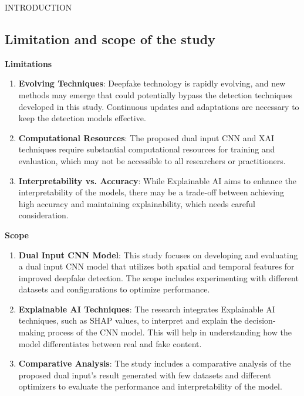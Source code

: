 \begin{section}[]{\uppercase{Introduction}}
    \subsection{Limitation and scope of the study}
    \textbf{Limitations}
    \begin{enumerate}
        \item \textbf{Evolving Techniques}: Deepfake technology is rapidly evolving, and new methods may emerge that could potentially bypass the detection techniques developed in this study. Continuous updates and adaptations are necessary to keep the detection models effective.
        \item \textbf{Computational Resources}: The proposed dual input CNN and XAI techniques require substantial computational resources for training and evaluation, which may not be accessible to all researchers or practitioners.
        \item \textbf{Interpretability vs. Accuracy}: While Explainable AI aims to enhance the interpretability of the models, there may be a trade-off between achieving high accuracy and maintaining explainability, which needs careful consideration.
    \end{enumerate}

    \noindent\textbf{Scope}
    \begin{enumerate}
        \item \textbf{Dual Input CNN Model}: This study focuses on developing and evaluating a dual input CNN model that utilizes both spatial and temporal features for improved deepfake detection. The scope includes experimenting with different datasets and configurations to optimize performance.
        \item \textbf{Explainable AI Techniques}: The research integrates Explainable AI techniques, such as SHAP values, to interpret and explain the decision-making process of the CNN model. This will help in understanding how the model differentiates between real and fake content.
        \item \textbf{Comparative Analysis}: The study includes a comparative analysis of the proposed dual input's result generated with few datasets and different optimizers to evaluate the performance and interpretability of the model.
    \end{enumerate}


\end{section}
